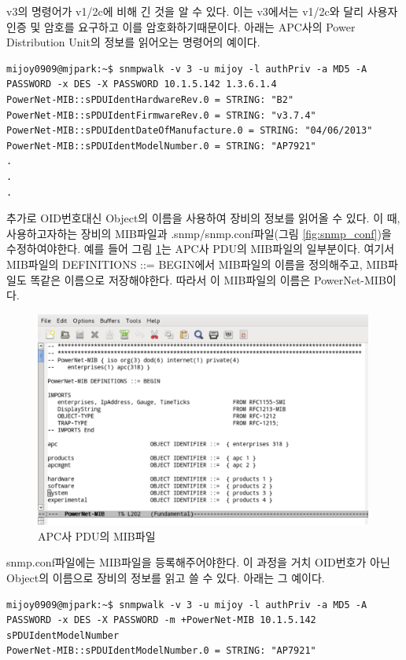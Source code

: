 \documentclass[11pt
  , a4paper
  , article
  , oneside
]{memoir}
\begin{document}
v3의 명령어가 v1/2c에 비해 긴 것을 알 수 있다. 이는 v3에서는 v1/2c와 달리 사용자인증 및 암호를 요구하고 이를 암호화하기때문이다. 아래는 APC사의 Power Distribution Unit의 정보를 읽어오는 명령어의 예이다.

\begin{lstlisting}[style=termstyle]
mijoy0909@mjpark:~$ snmpwalk -v 3 -u mijoy -l authPriv -a MD5 -A PASSWORD -x DES -X PASSWORD 10.1.5.142 1.3.6.1.4
PowerNet-MIB::sPDUIdentHardwareRev.0 = STRING: "B2"
PowerNet-MIB::sPDUIdentFirmwareRev.0 = STRING: "v3.7.4"
PowerNet-MIB::sPDUIdentDateOfManufacture.0 = STRING: "04/06/2013"
PowerNet-MIB::sPDUIdentModelNumber.0 = STRING: "AP7921"
.
.
.
\end{lstlisting}

추가로 OID번호대신 Object의 이름을 사용하여 장비의 정보를 읽어올 수 있다. 이 때, 사용하고자하는 장비의 MIB파일과  .snmp/snmp.conf파일(그림 \ref{fig:snmp_conf})을 수정하여야한다.
예를 들어 그림 \ref{fig:pdu_mib}는 APC사 PDU의 MIB파일의 일부분이다. 여기서 MIB파일의 DEFINITIONS ::= BEGIN에서 MIB파일의 이름을 정의해주고, MIB파일도 똑같은 이름으로 저장해야한다. 따라서 이 MIB파일의 이름은 PowerNet-MIB이다. 

\begin{figure}[h]
  \centering
  \includegraphics[width=0.99\textwidth]{./images/pdu_mib.eps}
  \caption{APC사 PDU의 MIB파일}
  \label{fig:pdu_mib}   
\end{figure}


\clearpage

snmp.conf파일에는 MIB파일을 등록해주어야한다. 이 과정을 거치 OID번호가 아닌 Object의 이름으로 장비의 정보를 읽고 쓸 수 있다. 아래는 그 예이다.

\begin{lstlisting}[style=termstyle]
mijoy0909@mjpark:~$ snmpwalk -v 3 -u mijoy -l authPriv -a MD5 -A PASSWORD -x DES -X PASSWORD -m +PowerNet-MIB 10.1.5.142 sPDUIdentModelNumber
PowerNet-MIB::sPDUIdentModelNumber.0 = STRING: "AP7921"
\end{lstlisting}
\end{document}
